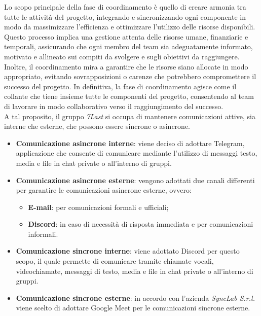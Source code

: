 Lo scopo principale della fase di coordinamento è quello di creare armonia tra tutte le attività del progetto, integrando e sincronizzando ogni componente in modo da massimizzare l'efficienza e ottimizzare l'utilizzo delle risorse disponibili. Questo processo implica una gestione attenta delle risorse umane, finanziarie e temporali, assicurando che ogni membro del team sia adeguatamente informato, motivato e allineato sui compiti da svolgere e sugli obiettivi da raggiungere. Inoltre, il coordinamento mira a garantire che le risorse siano allocate in modo appropriato, evitando sovrapposizioni o carenze che potrebbero compromettere il successo del progetto. In definitiva, la fase di coordinamento agisce come il collante che tiene insieme tutte le componenti del progetto, consentendo al team di lavorare in modo collaborativo verso il raggiungimento del successo.\\
A tal proposito, il gruppo \textit{7Last} si occupa di mantenere comunicazioni attive, sia interne che esterne, che possono essere sincrone o asincrone.
\begin{itemize}
    \item \textbf{Comunicazione asincrone interne}: viene deciso di adottare Telegram, applicazione che consente di comunicare mediante l'utilizzo di messaggi testo, media e file in chat private o all'interno di gruppi.
    \item \textbf{Comunicazione asincrone esterne}: vengono adottati due canali differenti per garantire le comunicazioni asincrone esterne, ovvero: 
        \begin{itemize}
            \item \textbf{E-mail}: per comunicazioni formali e ufficiali;
            \item \textbf{Discord}: in caso di necessità di risposta immediata e per comunicazioni informali.
        \end{itemize}
\end{itemize}
\begin{itemize}
    \item \textbf{Comunicazione sincrone interne}: viene adottato Discord per questo scopo, il quale permette di comunicare tramite chiamate vocali, videochiamate, messaggi di testo, media e file in chat private o all'interno di gruppi.
    \item \textbf{Comunicazione sincrone esterne}: in accordo con l'azienda \textit{SyncLab S.r.l.} viene scelto di adottare Google Meet per le comunicazioni sincrone esterne. 
\end{itemize}

